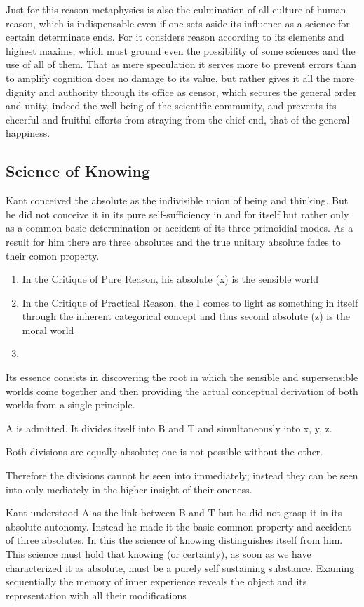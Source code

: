 \documentclass{article}
\begin{document}
Just for this reason metaphysics is also
the culmination of all culture of human reason,
which is indispensable even if one sets aside its
influence as a science for certain determinate ends.
For it considers reason according to its elements and highest maxims,
which must ground even the possibility of some sciences
and the use of all of them.
That as mere speculation it serves more to prevent errors
than to amplify cognition does no damage to its value,
but rather gives it all the more dignity and authority
through its office as censor,
which secures the general order and unity,
indeed the well-being of the scientific community,
and prevents its cheerful and fruitful efforts
from straying from the chief end, that of the general happiness. 

\subsection{Science of Knowing}

Kant conceived the absolute as the indivisible union of being and thinking.
But he did not conceive it in its pure self-sufficiency in and for itself
but rather only as a common basic determination or accident of its three primoidial modes.
As a result for him there are three absolutes and the true unitary absolute
fades to their comon property.
\begin{enumerate}
\item In the Critique of Pure Reason, his absolute (x) is the sensible world
\item In the Critique of Practical Reason, the I comes to light as
something in itself through the inherent categorical concept
and thus second absolute (z) is the moral world
\item
\end{enumerate}

Its essence consists in discovering the root in which the
sensible and supersensible worlds come together and then 
providing the actual conceptual derivation of both worlds
from a single principle.

A is admitted. It divides itself into B and T
and simultaneously into x, y, z.

Both divisions are equally absolute;
one is not possible without the other.

Therefore the divisions cannot be seen into immediately;
instead they can be seen into only mediately 
in the higher insight of their oneness.

Kant understood A as the link between B and T
but he did not grasp it in its absolute autonomy.
Instead he made it the basic common property
and accident of three absolutes.
In this the science of knowing distinguishes itself from him.
This science must hold that knowing (or certainty),
as soon as we have characterized it as absolute,
must be a purely self sustaining substance.
Examing sequentially the memory of inner experience
reveals the object and its representation with all their modifications
\end{document}

